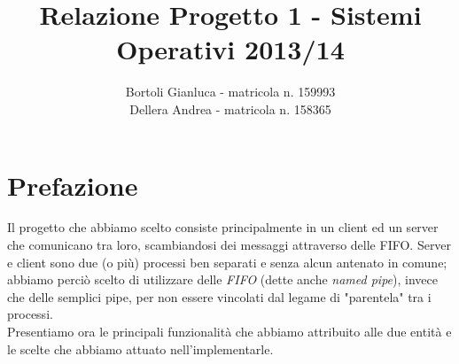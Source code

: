 \documentclass[a4paper,9pt]{article}
\begin{document}
\author{Bortoli Gianluca - matricola n. 159993\\Dellera Andrea - matricola n. 158365}
\title{Relazione Progetto 1 - Sistemi Operativi 2013/14}
\maketitle
\pagebreak

\section{Prefazione}
Il progetto che abbiamo scelto consiste principalmente in un client ed un server che comunicano tra loro, scambiandosi dei messaggi attraverso delle FIFO. Server e client sono due (o più) processi ben separati e senza alcun antenato in comune; abbiamo perciò scelto di utilizzare delle \emph{FIFO} (dette anche \emph{named pipe}), invece che delle semplici pipe, per non essere vincolati dal legame di "parentela" tra i processi.\\
Presentiamo ora le principali funzionalità che abbiamo attribuito alle due entità e le scelte che abbiamo attuato nell'implementarle.
\end{document}
